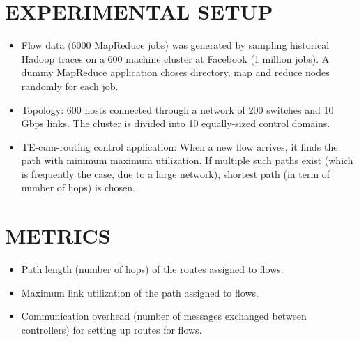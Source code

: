 \documentclass[portrait,a1]{a0poster}
\begin{document}
\begin{multicols}{2}
\color{SaddleBrown}
\section*{EXPERIMENTAL SETUP}
\color{DarkSlateGray}
\begin{itemize}
\item Flow data (6000 MapReduce jobs) was generated by sampling historical Hadoop traces on a 600 machine cluster at Facebook (1 million jobs). A dummy MapReduce application choses directory, map and reduce nodes randomly for each job.
\item Topology: 600 hosts connected through a network of 200 switches and 10 Gbps links. The cluster is divided into 10 equally-sized control domains.
\item TE-cum-routing control application: When a new flow arrives, it finds the path with minimum maximum utilization. If multiple such paths exist (which is frequently the case, due to a large network), shortest path (in term of number of hops) is chosen.
\end{itemize}

\color{SaddleBrown}
\section*{METRICS}
\color{DarkSlateGray}
\begin{itemize}
\item Path length (number of hops) of the routes assigned to flows.
\item Maximum link utilization of the path assigned to flows.
\item Communication overhead (number of messages exchanged between controllers) for setting up routes for flows.   
\end{itemize}




\end{multicols}
\end{document}
